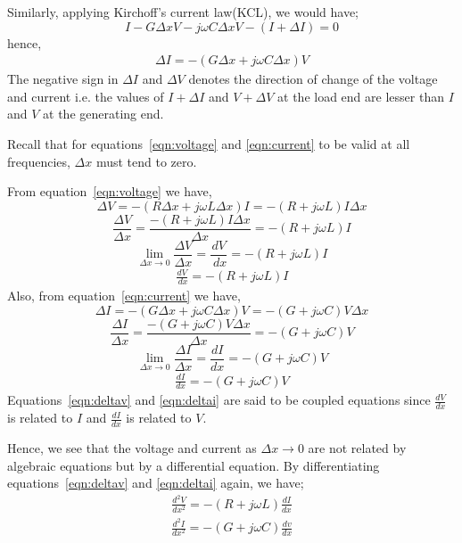 Similarly, applying Kirchoff's current law(KCL), we would have;
\begin{dmath*}
I  - G\Delta xV - j\omega C\Delta xV - (I + \Delta I) = 0
\end{dmath*}
hence,
\begin{align}
\Delta I = - (G \Delta x + j \omega C \Delta x)V
\label{eqn:current}
\end{align}
The negative sign in $ \Delta I $ and $ \Delta V $ denotes the direction of change of the voltage and current i.e. the values of $I + \Delta I$ and $V + \Delta V$ at the load end are lesser than $I$ and $V$ at the generating end.

Recall that for equations~\eqref{eqn:voltage} and \eqref{eqn:current} to be valid at all frequencies, $\Delta x$ must tend to zero.

From equation~\eqref{eqn:voltage} we have,
\begin{dmath*}
\Delta V = - (R \Delta x + j\omega L\Delta x)I = - (R + j\omega L)I\Delta x
\end{dmath*}
\begin{dmath*}
\frac{\Delta V }{\Delta x} = \frac{ - (R  + j\omega L)I\Delta x}{\Delta x} =  -(R  + j\omega L) I
\end{dmath*}
\[ \lim_{ \Delta x\to 0} \frac{\Delta V}{ \Delta x} = \frac{ dV}{ \ dx} = - (R + j \omega L)I \]
\begin{align}
\frac{ dV}{ \ dx} = - (R + j \omega L)I 
\label{eqn:deltav}
\end{align} 
Also, from equation~\eqref{eqn:current} we have,
\begin{dmath*}
\Delta I = - (G \Delta x + j\omega C\Delta x)V = - (G + j\omega C)V\Delta x
\end{dmath*}
\begin{dmath*}
\frac{	\Delta I }{\Delta x} = \frac{ - (G + j\omega C)V\Delta x}{\Delta x} =  - (G + j\omega C) V
\end{dmath*}
\[ \lim_{ \Delta x\to 0}	\frac{ \Delta I}{ \Delta x} = \frac{dI}{dx} = - (G + j\omega C)V \]
\begin{align}
\frac{dI}{dx} = - (G + j\omega C)V 
\label{eqn:deltai}
\end{align}
Equations~\eqref{eqn:deltav} and \eqref{eqn:deltai} are said to be coupled equations since $ \frac{dV}{dx} $ is related to $I$ and $ \frac{dI}{dx} $  is related to $V$.

Hence, we see that the voltage and current as $\Delta x \rightarrow 0$ are not related by algebraic equations but by a differential equation. By differentiating equations~\eqref{eqn:deltav} and \eqref{eqn:deltai} again, we have; 
\begin{align}
\frac{d^{2}V}{dx^{2}} = - (R + j\omega L)\frac{dI}{dx} 
\label{eqn:delta2v}
\end{align}
\begin{align}
\frac{d^{2}I}{dx^{2}} = - (G + j\omega C)\frac{dv}{dx}
\label{eqn:delta2i}
\end{align}

